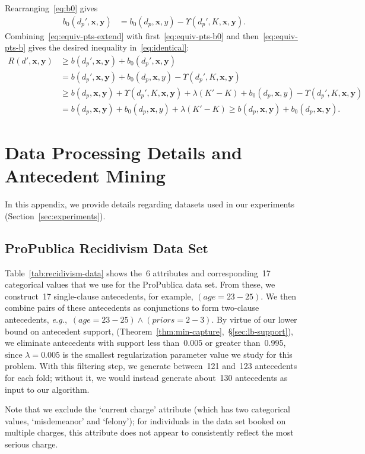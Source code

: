 \documentclass[twoside,11pt]{article}
\def\eg{{\it e.g.},~}
\newcommand{\x}{\mathbf{x}}
\newcommand{\y}{\mathbf{y}}
\def\RL{{d}}
\def\Prefix{d_p}
\def\Obj{R}
\def\Reg{{\lambda}}
\newcommand{\nn}{\nonumber}
\begin{document}
Rearranging~\eqref{eq:b0} gives
\begin{align}
b_0(\Prefix', \x, \y) &= b_0(\Prefix, \x, y) - \Upsilon(\Prefix', K, \x, \y).
\label{eq:equiv-pts-b0}
\end{align}
Combining~\eqref{eq:equiv-pts-extend} with first~\eqref{eq:equiv-pts-b0}
and then~\eqref{eq:equiv-pts-b} gives the desired inequality in~\eqref{eq:identical}:
\begin{align}
\Obj(\RL', \x, \y) &\ge b(\Prefix', \x, \y) + b_0(\Prefix', \x, \y) \nn \\
&= b(\Prefix', \x, \y) + b_0(\Prefix, \x, y) - \Upsilon(\Prefix', K, \x, \y) \nn \\
&\ge b(\Prefix, \x, \y) + \Upsilon(\Prefix', K, \x, \y) + \Reg (K' - K) + b_0(\Prefix, \x, y) - \Upsilon(\Prefix', K, \x, \y) \nn \\
&= b(\Prefix, \x, \y) + b_0(\Prefix, \x, y) + \Reg (K' - K)
\ge b(\Prefix, \x, \y) + b_0(\Prefix, \x, \y). \nn
\end{align}

\section{Data Processing Details and Antecedent Mining}
\label{appendix:data}

In this appendix, we provide details regarding datasets used in our experiments
(Section~\ref{sec:experiments}).

\subsection{ProPublica Recidivism Data Set}
Table~\ref{tab:recidivism-data} shows the~6 attributes
and corresponding~17 categorical values
that we use for the ProPublica data set.
%
From these, we construct~17 single-clause antecedents, for example,
${(age = 23-25)}$.
%
We then combine pairs of these antecedents as conjunctions to form
two-clause antecedents, \eg ${(age = 23-25) \wedge (priors = 2-3)}$.
%
By virtue of our lower bound on antecedent support,
(Theorem~\ref{thm:min-capture},~\S\ref{sec:lb-support}),
we eliminate antecedents with support less than~0.005 or greater than~0.995,
since ${\Reg = 0.005}$ is the smallest regularization parameter value
we study for this problem.
%
With this filtering step, we generate between~121 and~123 antecedents for each fold;
without it, we would instead generate about~130 antecedents as input to our algorithm.

Note that we exclude the `current charge' attribute (which has two categorical values,
`misdemeanor' and `felony'); for individuals in the data set booked on multiple charges,
this attribute does not appear to consistently reflect the most serious charge.
\end{document}
